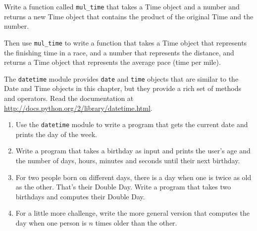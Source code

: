 \documentclass[10pt]{book}
\begin{document}
\begin{exercise}

Write a function called \verb"mul_time" that takes a Time object
and a number and returns a new Time object that contains
the product of the original Time and the number.

Then use \verb"mul_time" to write a function that takes a Time
object that represents the finishing time in a race, and a number
that represents the distance, and returns a Time object that represents
the average pace (time per mile).

\end{exercise}





\begin{exercise}

The {\tt datetime} module provides {\tt date} and {\tt time} objects
that are similar to the Date and Time objects in this chapter, but
they provide a rich set of methods and operators.  Read the
documentation at \url{http://docs.python.org/2/library/datetime.html}.

\begin{enumerate}

\item Use the {\tt datetime} module to write a program that gets the
  current date and prints the day of the week.

\item Write a program that takes a birthday as input and prints the
  user's age and the number of days, hours, minutes and seconds until
  their next birthday.

\item For two people born on different days, there is a day when one
  is twice as old as the other. That's their Double Day.  Write a
  program that takes two birthdays and computes their Double Day.

\item For a little more challenge, write the more general version that
  computes the day when one person is $n$ times older than the other.

\end{enumerate}

\end{exercise}
\end{document}
